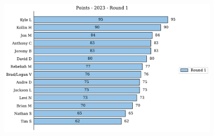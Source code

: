 \documentclass[10pt]{article}
\begin{document}
%
\begin{minipage}[t]{13cm}
    \vspace{0pt}
    \begin{figure}[H]
        \vspace{-1cm}
        \includegraphics[width=12cm,height=8cm,keepaspectratio]{../../figures/2023/Points-2023-Round1.pdf}
    \end{figure}
\end{minipage}
\end{document}
